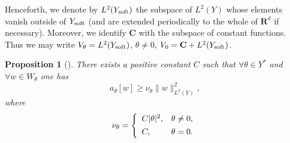 \documentclass[11pt]{article}
\newcommand\soft{{\rm soft}}
\newcommand{\R}{\mathbf{R}}
\def\C{\mathbf {C}}
\newtheorem{proposition}[theorem]{Proposition}
\theoremstyle{remark}
\begin{document}
Henceforth, we denote by $L^2(Y_\soft)$ the subspace of $L^2(Y)$ whose elements vanish outside of $Y_\soft$ (and are extended periodically to the whole of $\R^d$ if necessary). Moreover, we identify $\C$ with the subspace of constant functions. Thus we  may write $V_\theta = L^2(Y_\soft)$, $\theta\neq 0$, $V_0 = \C+ L^2(Y_\soft)$.







\begin{proposition}[{\cite[Hypotheses (H1) and (H3)]{CKS2023}}]
		There exists a positive constant $C$ such that	$\forall \theta\in  Y^*$  and  $\forall w\in W_\theta$ one has
		\begin{equation}\label{79}
			a_\theta[w]\geq \nu_\theta \|w\|_{L^2(Y)}^2,
		\end{equation}
	where
	\begin{equation*}
		\nu_\theta = \left\{
		\begin{array}{ll}
			C|\theta|^2, & \theta \neq 0,
			\\
			\vspace{-8pt}
			\\
			C, & \theta =0.
		\end{array}
		\right.
	\end{equation*}

\end{proposition}
\end{document}
